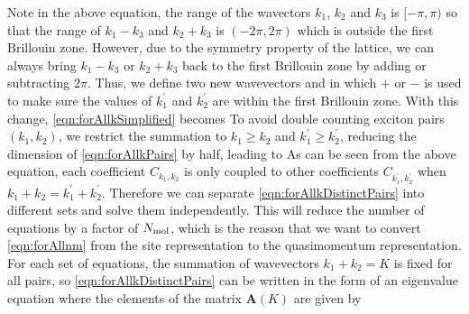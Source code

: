 Note in the above equation, the range of the wavectors $k_1$, $k_2$ and $k_3$ is $[-\pi, \pi)$ so that the range of 
$k_1 - k_3$ and $k_2 + k_3$ is $(-2\pi, 2\pi)$ which is outside the first Brillouin zone. However, due to the symmetry
 property of the lattice, we can always bring $k_1 - k_3$ or $k_2 + k_3$ back to the first Brillouin zone by adding or 
subtracting $2\pi$. Thus, we define two new wavevectors
and 
in which $+$ or $-$ is used to make sure the values of $k_1^{'}$ and $k_2^{'}$ are within the first Brillouin zone. With this change,  
\autoref{eqn:forAllkSimplified} becomes
To avoid double counting exciton pairs $(k_1, k_2)$, we restrict the summation to $k_1 \ge k_2$ and $k_1^{'} \ge k_2^{'}$,
 reducing the dimension of \autoref{eqn:forAllkPairs} by half, leading to 
As can be seen from the above equation, each coefficient $C_{k_1, k_2}$ is only coupled to other coefficients $C_{k_1^{'},
 k_2^{'}}$ when $k_1 + k_2 = k_1^{'} + k_2^{'} $. Therefore we can separate \autoref{eqn:forAllkDistinctPairs} into 
different sets and solve them independently. This will reduce the number of equations by a factor of $N_{\rm mol}$, which
 is the reason that we want to convert \autoref{eqn:forAllnm} from the site representation to the quasimomentum
 representation. For each set of equations, the summation of wavevectors $k_1 + k_2 =  K$ is fixed for all pairs,
 so \autoref{eqn:forAllkDistinctPairs} can be written in the form of an eigenvalue equation 
where the elements of the matrix $\mathbf{A}(K)$ are given by
